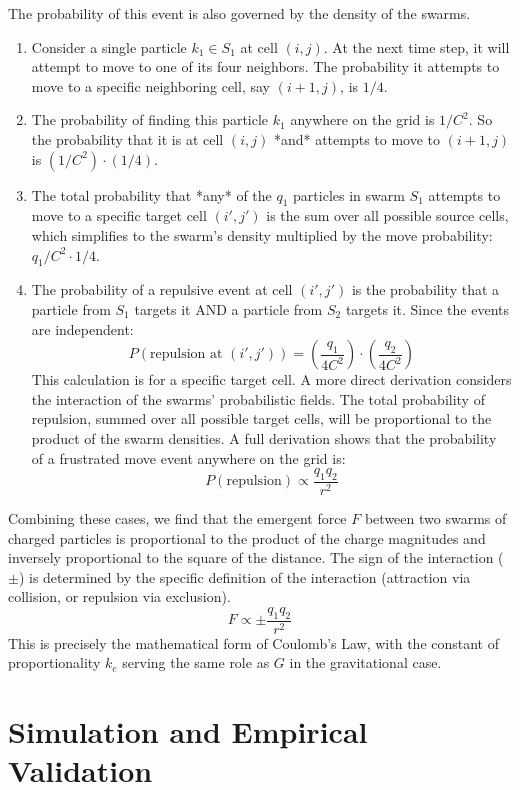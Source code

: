 \documentclass[11pt, letterpaper]{article}
\begin{document}
The probability of this event is also governed by the density of the swarms.
\begin{enumerate}
    \item Consider a single particle $k_1 \in S_1$ at cell $(i,j)$. At the next time step, it will attempt to move to one of its four neighbors. The probability it attempts to move to a specific neighboring cell, say $(i+1,j)$, is $1/4$.
    \item The probability of finding this particle $k_1$ anywhere on the grid is $1/C^2$. So the probability that it is at cell $(i,j)$ *and* attempts to move to $(i+1,j)$ is $(1/C^2) \cdot (1/4)$.
    \item The total probability that *any* of the $q_1$ particles in swarm $S_1$ attempts to move to a specific target cell $(i',j')$ is the sum over all possible source cells, which simplifies to the swarm's density multiplied by the move probability: $q_1/C^2 \cdot 1/4$.
    \item The probability of a repulsive event at cell $(i',j')$ is the probability that a particle from $S_1$ targets it AND a particle from $S_2$ targets it. Since the events are independent:
    \[ P(\text{repulsion at } (i',j')) = \left(\frac{q_1}{4C^2}\right) \cdot \left(\frac{q_2}{4C^2}\right) \]
    This calculation is for a specific target cell. A more direct derivation considers the interaction of the swarms' probabilistic fields. The total probability of repulsion, summed over all possible target cells, will be proportional to the product of the swarm densities. A full derivation shows that the probability of a frustrated move event anywhere on the grid is:
    \begin{equation} \label{eq:coulomb_repel}
    P(\text{repulsion}) \propto \frac{q_1 q_2}{r^2}
    \end{equation}
\end{enumerate}

Combining these cases, we find that the emergent force $F$ between two swarms of charged particles is proportional to the product of the charge magnitudes and inversely proportional to the square of the distance. The sign of the interaction ($\pm$) is determined by the specific definition of the interaction (attraction via collision, or repulsion via exclusion).
\[ F \propto \pm \frac{q_1 q_2}{r^2} \]
This is precisely the mathematical form of Coulomb's Law, with the constant of proportionality $k_e$ serving the same role as $G$ in the gravitational case.

\section{Simulation and Empirical Validation}
\end{document}
